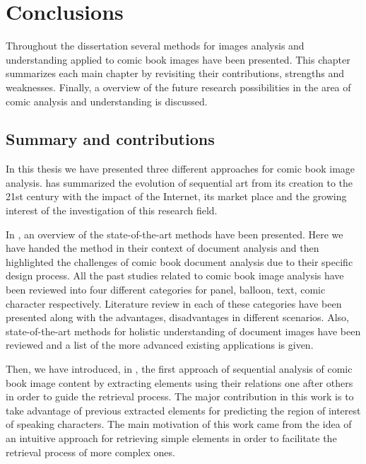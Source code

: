 \chapter{Conclusions} %
\label{chap:conclusions}

Throughout the dissertation several methods for images analysis and understanding applied to comic book images have been presented.
This chapter summarizes each main chapter by revisiting their contributions, strengths and weaknesses.
Finally, a overview of the future research possibilities in the area of comic analysis and understanding is discussed.

\section{Summary and contributions}
\label{conclusions:summary}


In this thesis we have presented three different approaches for comic book image analysis.  has summarized the evolution of sequential art from its creation to the 21st century with the impact of the Internet, its market place and the growing interest of the investigation of this research field.

In , an overview of the state-of-the-art methods have been presented. Here we have handed the method in their context of document analysis and then highlighted the challenges of comic book document analysis due to their specific design process.
All the past studies related to comic book image analysis have been reviewed into four different categories for panel, balloon, text, comic character respectively.
Literature review in each of these categories have been presented along with the advantages, disadvantages in different scenarios.
Also, state-of-the-art methods for holistic understanding of document images have been reviewed and a list of the more advanced existing applications is given.

Then, we have introduced, in , the first approach of sequential analysis of comic book image content by extracting elements using their relations one after others in order to guide the retrieval process.
The major contribution in this work is to take advantage of previous extracted elements for predicting the region of interest of speaking characters.
The main motivation of this work came from the idea of an intuitive approach for retrieving simple elements in order to facilitate the retrieval process of more complex ones.

